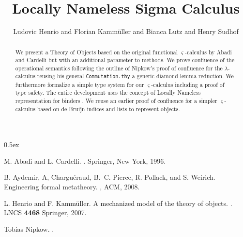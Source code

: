 \documentclass[11pt,a4paper]{article}
\begin{document}
\title{Locally Nameless Sigma Calculus}
\author{Ludovic Henrio and Florian Kamm\"uller and Bianca Lutz and Henry Sudhof}
\maketitle

\begin{abstract}
We present a Theory of Objects based on the original functional
$\varsigma$-calculus by Abadi and Cardelli \cite{AC96a} but with an
additional parameter to methods. We prove confluence of the operational
semantics following the outline of Nipkow's proof of confluence for the
$\lambda$-calculus reusing his general \texttt{Commutation.thy}
\cite{nip:01} a generic diamond lemma reduction. 
We furthermore formalize a simple type system for our $\varsigma$-calculus
including a proof of type safety.
The entire development uses the concept of Locally Nameless representation
for binders \cite{ACPPW:POPL08}. We reuse an earlier proof of confluence
\cite{HK:FMOODS07} for a simpler $\varsigma$-calculus based on de Bruijn indices
and lists to represent objects. 
\end{abstract}

\tableofcontents

\parindent 0pt\parskip 0.5ex




\begin{thebibliography}{10}
M. Abadi and L. Cardelli.
.
\newblock Springer, New York, 1996.


B. Aydemir, A, Charguéraud, B.~C. Pierce, R. Pollack, and
  S. Weirich.
\newblock Engineering formal metatheory.
, ACM, 2008. 

L. Henrio and F. Kammüller.
\newblock A mechanized model of the theory of objects.
. 
LNCS \textbf{4468} Springer, 2007.


Tobias Nipkow.
. 
\end{thebibliography}
\end{document}
